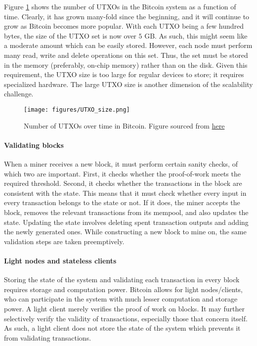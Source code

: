 \documentclass{article}
\newcommand{\pramod}[1]{{\color{red}
\footnotesize[Pramod: #1] }}
\begin{document}
Figure \ref{fig:utxo_size} shows the number of UTXOs in the Bitcoin system as a function of time. Clearly, it has grown many-fold since the beginning, and it will continue to grow as Bitcoin becomes more popular. With each UTXO being a few hundred bytes, the size of the UTXO set is now over $5$ GB. As such, this might seem like a moderate amount which can be easily stored. However, each node must perform many read, write and delete operations on this set. Thus, the set must be stored in the memory (preferably, on-chip memory) rather than on the disk. Given this requirement, the UTXO size is too large for regular devices to store; it requires specialized hardware. The large UTXO size is another dimension of the scalability challenge. %
\begin{figure}[htbp]
    \centering
    \texttt{[image: figures/UTXO\_size.png]}
    \caption{Number of UTXOs over time in Bitcoin. Figure sourced from \href{https://www.blockchain.com/charts/utxo-count}{here}}
    \label{fig:utxo_size}
\end{figure}

\paragraph{Validating blocks} When a miner receives a new block, it must perform certain sanity checks, of which two are important. First, it checks whether the proof-of-work meets the required threshold. Second, it checks whether the transactions in the block are consistent with the state. This means that it must check whether every input in every transaction belongs to the state or not. If it does, the miner accepts the block, removes the relevant transactions from its mempool, and also updates the state. Updating the state involves deleting spent transaction outputs and adding the newly generated ones. While constructing a new block to mine on, the same validation steps are taken preemptively.

\paragraph{Light nodes and stateless clients}
Storing the state of the system and validating each transaction in every block requires storage and computation power. Bitcoin allows for light nodes/clients, who can participate in the system with much lesser computation and storage power. A light client merely verifies the proof of work on blocks. It may further selectively verify the validity of transactions, especially those that concern itself. As such, a light client does not store the state of the system which prevents it from validating transactions.
\end{document}
